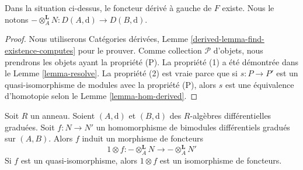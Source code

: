 \begin{lemma}
\label{lemma-derived-bc}
Dans la situation ci-dessus, le foncteur dérivé à gauche de $F$ existe. Nous le
notons $- \otimes_A^\mathbf{L} N : D(A, \text{d}) \to D(B, \text{d})$.
\end{lemma}

\begin{proof}
Nous utiliserons Catégories dérivées, Lemme
\ref{derived-lemma-find-existence-computes} pour le prouver. Comme
collection $\mathcal{P}$ d'objets, nous prendrons les objets ayant la propriété
(P). La propriété (1) a été démontrée dans le Lemme \ref{lemma-resolve}. La
propriété (2) est vraie parce que si $s : P \to P'$ est un quasi-isomorphisme de
modules avec la propriété (P), alors $s$ est une équivalence d'homotopie selon
le Lemme \ref{lemma-hom-derived}.
\end{proof}

\begin{lemma}
\label{lemma-functoriality-bc}
Soit $R$ un anneau. Soient $(A, \text{d})$ et $(B, \text{d})$ des $R$-algèbres
différentielles graduées. Soit $f : N \to N'$ un homomorphisme de bimodules
différentiels gradués sur $(A, B)$. Alors $f$ induit un morphisme de foncteurs
$$
1\otimes f :
- \otimes_A^\mathbf{L} N
\longrightarrow
- \otimes_A^\mathbf{L} N'
$$
Si $f$ est un quasi-isomorphisme, alors $1 \otimes f$ est un isomorphisme de
foncteurs.
\end{lemma}

